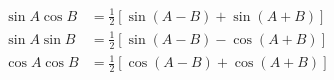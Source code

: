 \documentclass[12pt]{article}
\begin{document}
\begin{align*}
  \sin A \cos B &= \frac{1}{2}\left[ \sin(A-B)+\sin(A+B) \right] \\
  \sin A \sin B &= \frac{1}{2}\left[ \sin(A-B)-\cos(A+B) \right] \\
  \cos A \cos B &= \frac{1}{2}\left[ \cos(A-B)+\cos(A+B) \right] \\
\end{align*}
\end{document}

